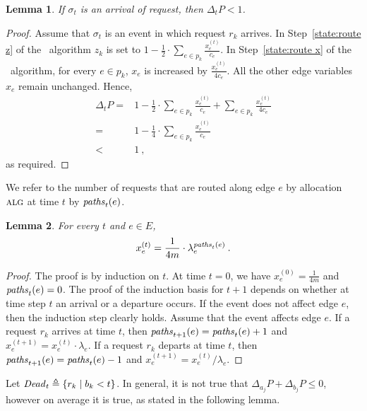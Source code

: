 \documentclass[11pt]{article}
\newenvironment{proof sketch}[1]{\noindent {\emph{Proof sketch of #1:}}}{\hfill \qed}
\newtheorem{lemma}{Lemma}
\newcommand{\eqdf}{\triangleq}
\newcommand{\alg}{\textsc{alg}}
\newcommand{\PR}{\Delta_t P}
\newcommand{\PRaj}{\Delta_{a_j} P}
\newcommand{\PRbj}{\Delta_{b_j} P}
\newcommand{\dead}{\text{\textit{Dead}}}
\newcommand{\paths}{\text{\textit{paths}}_t}
\newcommand{\pathsp}{\text{\textit{paths}}_{t+1}}
\newcommand{\routealg}{\text{\textsc{Route}}}
\begin{document}
\begin{lemma}\label{delta primal arrival}
If $\sigma_t$ is an arrival of request, then $\PR < 1$.
\end{lemma}
\begin{proof}
  Assume that $\sigma_t$ is an event in which request $r_k$ arrives.
  In Step~\ref{state:route z} of the \routealg\ algorithm $z_k$ is set
  to $1-\frac 12 \cdot \sum_{e\in p_k}\frac{x_{e}^{(t)}}{c_e}$.  In
  Step~\ref{state:route x} of the \routealg\ algorithm, for every $e
  \in p_k$, $x_e$ is increased by $\frac{x_e^{(t)}}{4c_e}$.  All the
  other edge variables $x_e$ remain unchanged.  Hence,
    \begin{align}
      \PR =&  1- \frac 12 \cdot \sum_{e\in p_k}\frac{x_{e}^{(t)}}{c_e} + \sum_{e\in p_k} \frac{x_e^{(t)}}{4c_e} \nonumber\\
          =&1- \frac 14 \cdot \sum_{e\in p_k} \frac{x_e^{(t)}}{c_e}  \label{eqn:case 1}\\
          < & 1\:, \nonumber
    \end{align}
    as required.
\end{proof}

We refer to the number of requests that are routed along edge $e$ by allocation $\alg$ at time $t$ by $\paths(e)$.
\begin{lemma}\label{lemma:valx}
For every $t$ and $e \in E$,
    \begin{align*}
      x_e ^{(t)} = \frac{1}{4m} \cdot \lambda_e^{\paths(e)}\:.
    \end{align*}
\end{lemma}
\begin{proof}
  The proof is by induction on $t$. At time $t=0$, we have
  $x_e^{(0)}=\frac{1}{4m}$ and $\paths(e)=0$.  The proof of the
  induction basis for $t+1$ depends on whether at time step $t$ an
  arrival or a departure occurs.  If the event does not affect edge
  $e$, then the induction step clearly holds. Assume that the event
  affects edge $e$. If a request $r_k$ arrives at time $t$, then
  $\pathsp(e)=\paths(e)+1$ and $x_e^{(t+1)} = x_e^{(t)} \cdot \lambda_e$.
If a request $r_k$ departs at time $t$, then
  $\pathsp(e)=\paths(e)-1$ and $x_e^{(t+1)} = x_e^{(t)}/\lambda_e$.
\end{proof}

Let $\dead_t \eqdf \{r_k \mid b_k < t\}$.
In general, it is not true that $\PRaj+\PRbj \leq 0$, however on average it is true, as stated in the following lemma.
\end{document}
